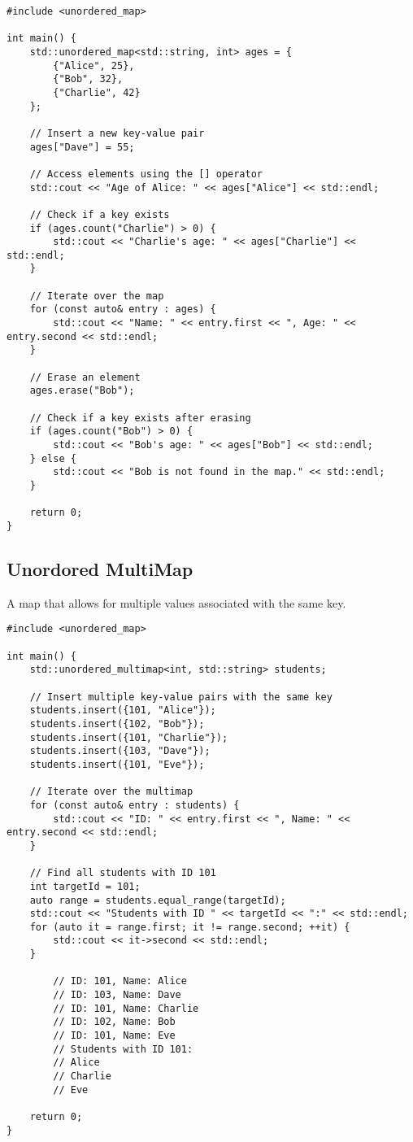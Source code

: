 \documentclass[openany]{report}
\begin{document}
\begin{verbatim}
#include <unordered_map>

int main() {
    std::unordered_map<std::string, int> ages = {
        {"Alice", 25},
        {"Bob", 32},
        {"Charlie", 42}
    };

    // Insert a new key-value pair
    ages["Dave"] = 55;

    // Access elements using the [] operator
    std::cout << "Age of Alice: " << ages["Alice"] << std::endl;

    // Check if a key exists
    if (ages.count("Charlie") > 0) {
        std::cout << "Charlie's age: " << ages["Charlie"] << std::endl;
    }

    // Iterate over the map
    for (const auto& entry : ages) {
        std::cout << "Name: " << entry.first << ", Age: " << entry.second << std::endl;
    }

    // Erase an element
    ages.erase("Bob");

    // Check if a key exists after erasing
    if (ages.count("Bob") > 0) {
        std::cout << "Bob's age: " << ages["Bob"] << std::endl;
    } else {
        std::cout << "Bob is not found in the map." << std::endl;
    }

    return 0;
}
\end{verbatim}

\subsection{Unordored MultiMap}

A map that allows for multiple values associated with the same key. 

\begin{verbatim}
#include <unordered_map>

int main() {
    std::unordered_multimap<int, std::string> students;

    // Insert multiple key-value pairs with the same key
    students.insert({101, "Alice"});
    students.insert({102, "Bob"});
    students.insert({101, "Charlie"});
    students.insert({103, "Dave"});
    students.insert({101, "Eve"});

    // Iterate over the multimap
    for (const auto& entry : students) {
        std::cout << "ID: " << entry.first << ", Name: " << entry.second << std::endl;
    }

    // Find all students with ID 101
    int targetId = 101;
    auto range = students.equal_range(targetId);
    std::cout << "Students with ID " << targetId << ":" << std::endl;
    for (auto it = range.first; it != range.second; ++it) {
        std::cout << it->second << std::endl;
    }

        // ID: 101, Name: Alice
        // ID: 103, Name: Dave
        // ID: 101, Name: Charlie
        // ID: 102, Name: Bob
        // ID: 101, Name: Eve
        // Students with ID 101:
        // Alice
        // Charlie
        // Eve

    return 0;
}
\end{verbatim}
\end{document}
